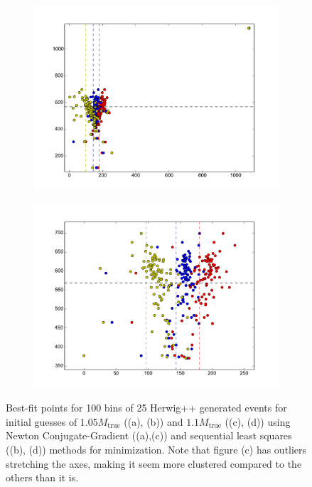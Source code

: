 \documentclass[twoside,english]{uiofysmaster}
\begin{document}
\begin{figure}[hbt]
	\begin{subfigure}[b]{0.45\textwidth}
		\includegraphics[width=\textwidth]{figures/herwig_scipy_slsqp_minimization_1p1_initial_guess.pdf} 
		\caption{}
		\label{fig:scipy_fit_nosmear3}
	\end{subfigure}
	\begin{subfigure}[b]{0.45\textwidth}
		\includegraphics[width=\textwidth]{figures/herwig_scipy_tnc_minimization_1p1_initial_guess.pdf} 
		\caption{}
		\label{fig:scipy_fit_nosmear4}
	\end{subfigure}
	\caption{Best-fit points for 100 bins of 25 Herwig++ generated events for initial guesses of $1.05 M_\mathrm{true}$ ((a), (b)) and $1.1 M_\mathrm{true}$ ((c), (d)) using Newton Conjugate-Gradient ((a),(c)) and sequential least squares ((b), (d)) methods for minimization. Note that figure (c) has outliers stretching the axes, making it seem more clustered compared to the others than it is.}
	\label{fig:scipy_fit_nosmear}
\end{figure}
\end{document}
